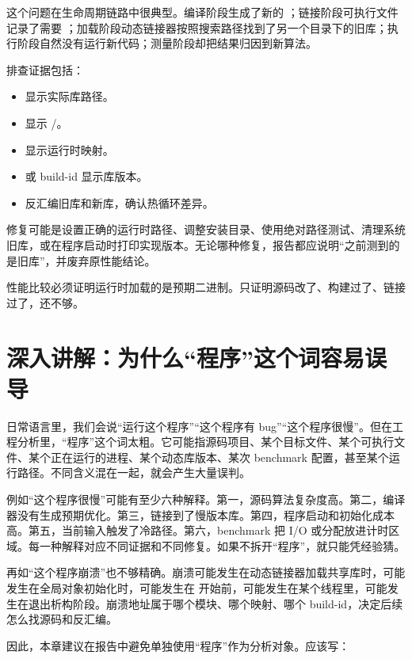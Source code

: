 这个问题在生命周期链路中很典型。编译阶段生成了新的 ；链接阶段可执行文件记录了需要 ；加载阶段动态链接器按照搜索路径找到了另一个目录下的旧库；执行阶段自然没有运行新代码；测量阶段却把结果归因到新算法。

排查证据包括：

\begin{itemize}
  \item {} 显示实际库路径。
  \item {} 显示 /。
  \item {} 显示运行时映射。
  \item {} 或 build-id 显示库版本。
  \item 反汇编旧库和新库，确认热循环差异。
\end{itemize}

修复可能是设置正确的运行时路径、调整安装目录、使用绝对路径测试、清理系统旧库，或在程序启动时打印实现版本。无论哪种修复，报告都应说明“之前测到的是旧库”，并废弃原性能结论。

\begin{warningbox}
性能比较必须证明运行时加载的是预期二进制。只证明源码改了、构建过了、链接过了，还不够。
\end{warningbox}

\section{深入讲解：为什么“程序”这个词容易误导}

日常语言里，我们会说“运行这个程序”“这个程序有 bug”“这个程序很慢”。但在工程分析里，“程序”这个词太粗。它可能指源码项目、某个目标文件、某个可执行文件、某个正在运行的进程、某个动态库版本、某次 benchmark 配置，甚至某个运行路径。不同含义混在一起，就会产生大量误判。

例如“这个程序很慢”可能有至少六种解释。第一，源码算法复杂度高。第二，编译器没有生成预期优化。第三，链接到了慢版本库。第四，程序启动和初始化成本高。第五，当前输入触发了冷路径。第六，benchmark 把 I/O 或分配放进计时区域。每一种解释对应不同证据和不同修复。如果不拆开“程序”，就只能凭经验猜。

再如“这个程序崩溃”也不够精确。崩溃可能发生在动态链接器加载共享库时，可能发生在全局对象初始化时，可能发生在  开始前，可能发生在某个线程里，可能发生在退出析构阶段。崩溃地址属于哪个模块、哪个映射、哪个 build-id，决定后续怎么找源码和反汇编。

因此，本章建议在报告中避免单独使用“程序”作为分析对象。应该写：


